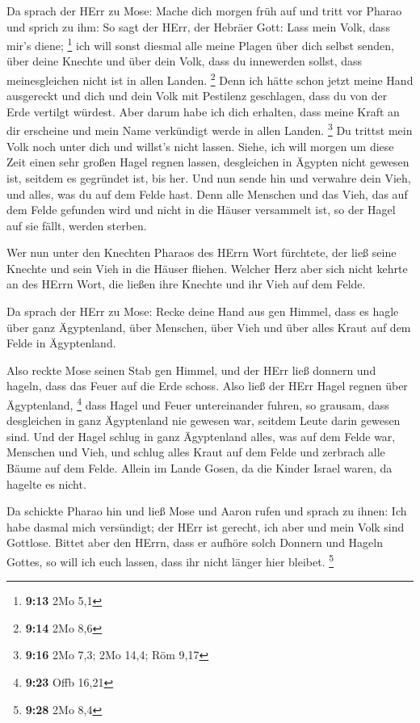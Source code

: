  Da sprach der HErr zu Mose: Mache dich morgen früh auf und
tritt vor Pharao und sprich zu ihm: So sagt der HErr, der Hebräer Gott:
Lass mein Volk, dass mir's diene; \footnote{\textbf{9:13} 2Mo 5,1}
 ich will sonst diesmal alle meine Plagen über dich selbst
senden, über deine Knechte und über dein Volk, dass du innewerden
sollst, dass meinesgleichen nicht ist in allen Landen. \footnote{\textbf{9:14}
  2Mo 8,6}  Denn ich hätte schon jetzt meine Hand
ausgereckt und dich und dein Volk mit Pestilenz geschlagen, dass du von
der Erde vertilgt würdest.  Aber darum habe ich dich
erhalten, dass meine Kraft an dir erscheine und mein Name verkündigt
werde in allen Landen. \footnote{\textbf{9:16} 2Mo 7,3; 2Mo 14,4; Röm
  9,17}  Du trittst mein Volk noch unter dich und willst's
nicht lassen.  Siehe, ich will morgen um diese Zeit einen
sehr großen Hagel regnen lassen, desgleichen in Ägypten nicht gewesen
ist, seitdem es gegründet ist, bis her.  Und nun sende hin
und verwahre dein Vieh, und alles, was du auf dem Felde hast. Denn alle
Menschen und das Vieh, das auf dem Felde gefunden wird und nicht in die
Häuser versammelt ist, so der Hagel auf sie fällt, werden sterben.

 Wer nun unter den Knechten Pharaos des HErrn Wort
fürchtete, der ließ seine Knechte und sein Vieh in die Häuser fliehen.
 Welcher Herz aber sich nicht kehrte an des HErrn Wort, die
ließen ihre Knechte und ihr Vieh auf dem Felde.

 Da sprach der HErr zu Mose: Recke deine Hand aus gen
Himmel, dass es hagle über ganz Ägyptenland, über Menschen, über Vieh
und über alles Kraut auf dem Felde in Ägyptenland.

 Also reckte Mose seinen Stab gen Himmel, und der HErr ließ
donnern und hageln, dass das Feuer auf die Erde schoss. Also ließ der
HErr Hagel regnen über Ägyptenland, \footnote{\textbf{9:23} Offb 16,21}
 dass Hagel und Feuer untereinander fuhren, so grausam,
dass desgleichen in ganz Ägyptenland nie gewesen war, seitdem Leute
darin gewesen sind.  Und der Hagel schlug in ganz
Ägyptenland alles, was auf dem Felde war, Menschen und Vieh, und schlug
alles Kraut auf dem Felde und zerbrach alle Bäume auf dem Felde.
 Allein im Lande Gosen, da die Kinder Israel waren, da
hagelte es nicht.

 Da schickte Pharao hin und ließ Mose und Aaron rufen und
sprach zu ihnen: Ich habe dasmal mich versündigt; der HErr ist gerecht,
ich aber und mein Volk sind Gottlose.  Bittet aber den
HErrn, dass er aufhöre solch Donnern und Hageln Gottes, so will ich euch
lassen, dass ihr nicht länger hier bleibet. \footnote{\textbf{9:28} 2Mo
  8,4}

